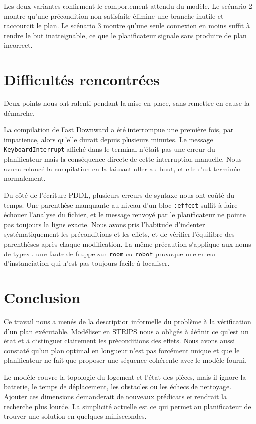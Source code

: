 \documentclass[a4paper, 11pt]{report}
\begin{document}
	Les deux variantes confirment le comportement attendu du modèle. Le
	scénario 2 montre qu'une précondition non satisfaite élimine une branche
	inutile et raccourcit le plan. Le scénario 3 montre qu'une seule connexion
	en moins suffit à rendre le but inatteignable, ce que le planificateur
	signale sans produire de plan incorrect.
	
	\section{Difficultés rencontrées}
	
	Deux points nous ont ralenti pendant la mise en place, sans remettre en
	cause la démarche.
	
	La compilation de Fast Downward a été interrompue une première fois, par
	impatience, alors qu'elle durait depuis plusieurs minutes. Le message
	\texttt{KeyboardInterrupt} affiché dans le terminal n'était pas une erreur
	du planificateur mais la conséquence directe de cette interruption
	manuelle. Nous avons relancé la compilation en la laissant aller au bout,
	et elle s'est terminée normalement.
	
	Du côté de l'écriture PDDL, plusieurs erreurs de syntaxe nous ont coûté du
	temps. Une parenthèse manquante au niveau d'un bloc \texttt{:effect} suffit
	à faire échouer l'analyse du fichier, et le message renvoyé par le
	planificateur ne pointe pas toujours la ligne exacte. Nous avons pris
	l'habitude d'indenter systématiquement les préconditions et les effets, et
	de vérifier l'équilibre des parenthèses après chaque modification. La même
	précaution s'applique aux noms de types : une faute de frappe sur
	\texttt{room} ou \texttt{robot} provoque une erreur d'instanciation qui
	n'est pas toujours facile à localiser.
	
	\newpage
	\section{Conclusion}
	
	Ce travail nous a menés de la description informelle du problème à la vérification d'un plan exécutable. Modéliser en STRIPS nous a obligés à définir ce qu'est un état et à distinguer clairement les préconditions des effets. Nous avons aussi constaté qu'un plan optimal en longueur n'est pas forcément unique et que le planificateur ne fait que proposer une séquence cohérente avec le modèle fourni.
	
	Le modèle couvre la topologie du logement et l'état des pièces, mais il ignore la batterie, le temps de déplacement, les obstacles ou les échecs de nettoyage. Ajouter ces dimensions demanderait de nouveaux prédicats et rendrait la recherche plus lourde. La simplicité actuelle est ce qui permet au planificateur de trouver une solution en quelques millisecondes.
	
\end{document}
